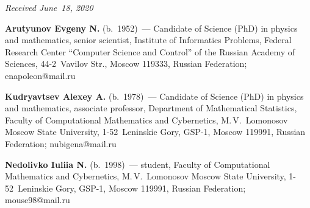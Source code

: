 \vspace*{-3pt}

  \hfill{\small\textit{Received June~18, 2020}}




\Contr

\noindent
\textbf{Arutyunov Evgeny N.} (b.\ 1952)~--- Candidate of Science (PhD) 
in physics and mathematics, senior scientist, Institute of Informatics Problems, Federal Research Center 
``Computer Science and Control'' of the Russian Academy of Sciences, 44-2~Vavilov Str., 
Moscow 119333, Russian Federation; \mbox{enapoleon@mail.ru}

\vspace*{3pt}

\noindent
\textbf{Kudryavtsev Alexey A.} (b.\ 1978)~--- 
Candidate of Science (PhD) in physics and mathematics, associate professor, Department of Mathematical 
Statistics, Faculty of Computational Mathematics and Cybernetics, 
M.\,V.~Lomonosov Moscow State University, 1-52~Leninskie Gory, GSP-1, Moscow 119991, Russian Federation; 
\mbox{nubigena@mail.ru}

\vspace*{3pt}

\noindent
\textbf{Nedolivko Iuliia N.} (b.\ 1998)~--- 
student, Faculty of Computational Mathematics and Cybernetics, 
M.\,V.~Lomonosov Moscow State University, 1-52~Leninskie Gory, GSP-1, Moscow 119991, Russian Federation; 
\mbox{mouse98@mail.ru}
\label{end\stat}

\renewcommand{\bibname}{\protect\rm Литература}